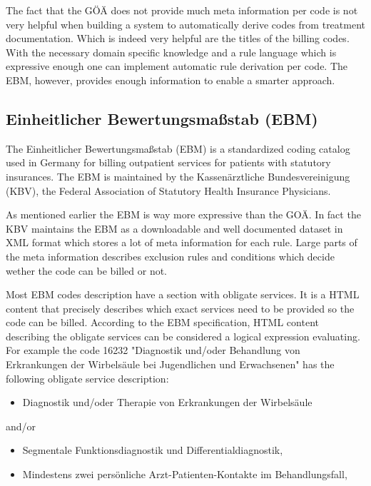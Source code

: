 The fact that the GÖÄ does not provide much meta information per code is not very helpful when building a system to automatically derive codes from treatment documentation.
Which is indeed very helpful are the titles of the billing codes.
With the necessary domain specific knowledge and a rule language which is expressive enough one can implement automatic rule derivation per code.
The EBM, however, provides enough information to enable a smarter approach.


\subsection{Einheitlicher Bewertungsmaßstab (EBM)}
The Einheitlicher Bewertungsmaßstab (EBM) is a standardized coding catalog used in Germany for billing outpatient services for patients with statutory insurances.
The EBM is maintained by the Kassenärztliche Bundesvereinigung (KBV), the Federal Association of Statutory Health Insurance Physicians.

As mentioned earlier the EBM is way more expressive than the GOÄ.
In fact the KBV maintains the EBM as a downloadable and well documented dataset in XML format which stores a lot of meta information for each rule.
Large parts of the meta information describes exclusion rules and conditions which decide wether the code can be billed or not.


Most EBM codes description have a section with obligate services.
It is a HTML content that precisely describes which exact services need to be provided so the code can be billed.
According to the EBM specification, HTML content describing the obligate services can be considered a logical expression evaluating.
For example the code 16232 "Diagnostik und/oder Behandlung von Erkrankungen der Wirbelsäule bei Jugendlichen und Erwachsenen" has the following obligate service description:


\begin{itemize}
    \item Diagnostik und/oder Therapie von Erkrankungen der Wirbelsäule
\end{itemize}
and/or
\begin{itemize}
    \item Segmentale Funktionsdiagnostik und Differentialdiagnostik,
    \item Mindestens zwei persönliche Arzt-Patienten-Kontakte im Behandlungsfall,
\end{itemize}





